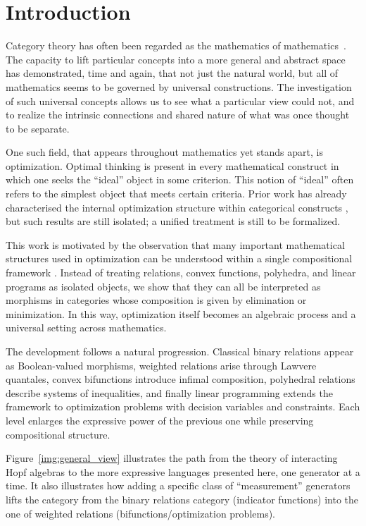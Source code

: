 \section{Introduction}

Category theory has often been regarded as the mathematics of mathematics~\cite{maclane1998categories}.
The capacity to lift particular concepts into a more general and abstract space
has demonstrated, time and again, that not just the natural world,
but all of mathematics seems to be governed by universal constructions.
The investigation of such universal concepts allows us to see what a particular view
could not, and to realize the intrinsic connections and shared nature of what was once thought
to be separate.

One such field, that appears throughout mathematics
yet stands apart, is optimization.
Optimal thinking is present in every mathematical construct in which one seeks the
``ideal'' object in some criterion. This notion of ``ideal'' often refers to the
simplest object that meets certain criteria. Prior work has already characterised the internal
optimization structure within categorical constructs \cite{Khadh2026bridging},
but such results are still isolated; a unified treatment is still to be formalized.

This work is motivated by the observation that many important
mathematical structures used in optimization can be understood within
a single compositional framework \cite{stein2024compositional, hanks2024compositionalopt}.
Instead of treating relations, convex functions, polyhedra,
and linear programs as isolated objects, we show that they can all be
interpreted as morphisms in categories whose composition is given by elimination or minimization.
In this way, optimization itself becomes an algebraic process and a universal setting across mathematics.

The development follows a natural progression.
Classical binary relations appear as Boolean-valued morphisms, weighted relations arise
through Lawvere quantales, convex bifunctions introduce infimal composition, polyhedral
relations describe systems of inequalities, and finally linear programming extends the
framework to optimization problems with decision variables and constraints. Each level
enlarges the expressive power of the previous one while preserving compositional structure.

Figure~\ref{img:general_view} illustrates the path from the theory of interacting Hopf algebras \cite{bonchi2017interacting}
to the more expressive languages presented here, one generator at a time. It also illustrates how adding a specific class
of ``measurement'' generators lifts the category from the binary relations category (indicator functions) into the one of
weighted relations (bifunctions/optimization problems).

